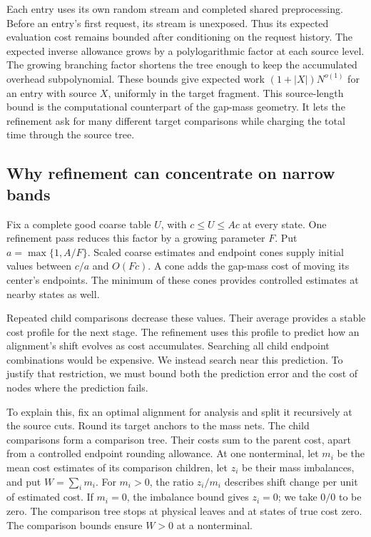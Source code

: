 \documentclass[11pt]{article}
\theoremstyle{definition}
\newcommand{\1}{\mathbf 1}
\begin{document}
Each entry uses its own random stream and completed shared
preprocessing.
Before an entry's first request, its stream is unexposed.
Thus its expected evaluation cost remains bounded after conditioning
on the request history.
The expected inverse allowance grows by a polylogarithmic factor at
each source level. The growing branching factor shortens the tree
enough to keep the accumulated overhead subpolynomial.
These bounds give expected work $(1+|X|)N^{o(1)}$ for an entry with source $X$,
uniformly in the target fragment.
This source-length bound is the computational counterpart of the
gap-mass geometry.
It lets the refinement ask for many different target comparisons while
charging the total time through the source tree.

\subsection{Why refinement can concentrate on narrow bands}

Fix a complete good coarse table $U$, with
$c\le U\le Ac$ at every state.
One refinement pass reduces this factor by a growing parameter $F$.
Put $a=\max\{1,A/F\}$.
Scaled coarse estimates and endpoint cones supply initial values
between $c/a$ and $O(Fc)$.
A cone adds the gap-mass cost of moving its center's endpoints.
The minimum of these cones provides controlled estimates at nearby
states as well.

Repeated child comparisons decrease these values.
Their average provides a stable cost profile for the next stage.
The refinement uses this profile to predict how an alignment's shift
evolves as cost accumulates.
Searching all child endpoint combinations would be expensive.
We instead search near this prediction. To justify that restriction,
we must bound both the prediction error and the cost of nodes where
the prediction fails.

To explain this, fix an optimal alignment for analysis and split it
recursively at the source cuts.
Round its target anchors to the mass nets.
The child comparisons form a comparison tree.
Their costs sum to the parent cost, apart from a controlled endpoint
rounding allowance.
At one nonterminal, let $m_i$ be the mean cost estimates of its
comparison children, let $z_i$ be their mass imbalances, and put
$W=\sum_i m_i$.
For $m_i>0$, the ratio $z_i/m_i$ describes shift change per unit of
estimated cost. If $m_i=0$, the imbalance bound gives $z_i=0$;
we take $0/0$ to be zero. The comparison tree stops at physical leaves
and at states of true cost zero. The comparison bounds ensure
$W>0$ at a nonterminal.
\end{document}
